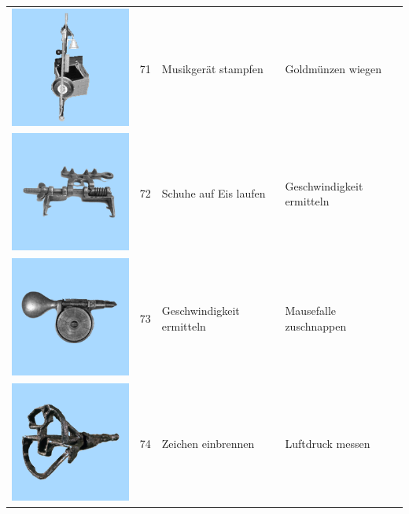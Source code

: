 \documentclass[
  english,
  doc,12pt,twoside,floatsintext]{apa7}
\begin{document}
\begin{center}
\begin{ThreePartTable}
\begin{longtable}{llll}
\includegraphics[valign=c, scale=0.19]{../materials/unfamiliar/71.png} & 71 & Musikgerät stampfen & Goldmünzen wiegen\\
\includegraphics[valign=c, scale=0.19]{../materials/unfamiliar/72.png} & 72 & Schuhe auf Eis laufen & Geschwindigkeit ermitteln\\
\includegraphics[valign=c, scale=0.19]{../materials/unfamiliar/73.png} & 73 & Geschwindigkeit ermitteln & Mausefalle zuschnappen\\
\includegraphics[valign=c, scale=0.19]{../materials/unfamiliar/74.png} & 74 & Zeichen einbrennen & Luftdruck messen\\

\end{longtable}
\end{ThreePartTable}
\end{center}
\end{document}
